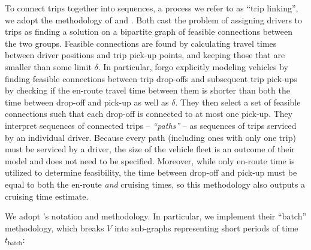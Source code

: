 \documentclass[]{trbunofficial_bdit_final}
\begin{document}
To connect trips together into sequences, a process we refer to as ``trip
linking'', we adopt the methodology of  and
. Both cast the problem of assigning drivers to trips
as finding a solution on a bipartite graph of feasible connections between the
two groups. Feasible connections are found by calculating travel times between
driver positions and trip pick-up points, and keeping those that are smaller
than some limit \(\delta\). In particular, \citeauthor{vazifeh2018addressing}
forgo explicitly modeling vehicles by finding feasible connections between trip
drop-offs and subsequent trip pick-ups by checking if the en-route travel time
between them is shorter than both the time between drop-off and pick-up as well
as \(\delta\). They then select a set of feasible connections such that each
drop-off is connected to at most one pick-up. They interpret sequences of
connected trips -- \emph{``paths''} -- as sequences of trips serviced by an individual
driver. Because every path (including ones with only one trip) must be serviced
by a driver, the size of the vehicle fleet is an outcome of their model and
does not need to be specified. Moreover, while only en-route time is utilized
to determine feasibility, the time between drop-off and pick-up must be equal
to both the en-route \emph{and} cruising times, so this methodology also outputs a
cruising time estimate.

We adopt \citeauthor{vazifeh2018addressing}'s notation and methodology. In
particular, we implement their ``batch'' methodology, which breaks \(V\) into
sub-graphs representing short periods of time \(t_\mathrm{batch}\):
\end{document}

